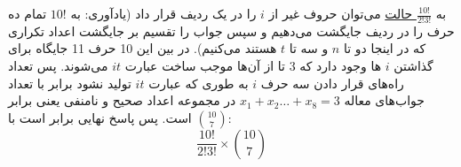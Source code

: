 \p
به
\underline{$\frac{10!}{2!3!}$ حالت}
 می‌توان حروف غیر از
 $i$ را در یک ردیف قرار داد
(یادآوری: به 
$10!$
تمام ده حرف را در ردیف جایگشت می‌دهیم و سپس جواب را تقسیم بر جایگشت اعداد تکراری که در اینجا دو تا $n$ و سه تا $t$ هستند می‌کنیم).
در بین این 10 حرف 11 جایگاه برای گذاشتن $i$ ها وجود دارد که 3 تا از آن‌ها موجب ساخت عبارت $it$ می‌شوند.
پس تعداد راه‌های قرار دادن سه حرف $i$ به طوری که عبارت $it$ تولید نشود برابر با تعداد جواب‌های معاله
$x_1 + x_2 \ldots + x_8 = 3$
در مجموعه اعداد صحیح و نامنفی یعنی برابر
\underline{$\binom{10}{7}$}
است. پس پاسخ نهایی برابر است با:
$$\frac{10!}{2!3!}  \times \binom{10}{7}$$


